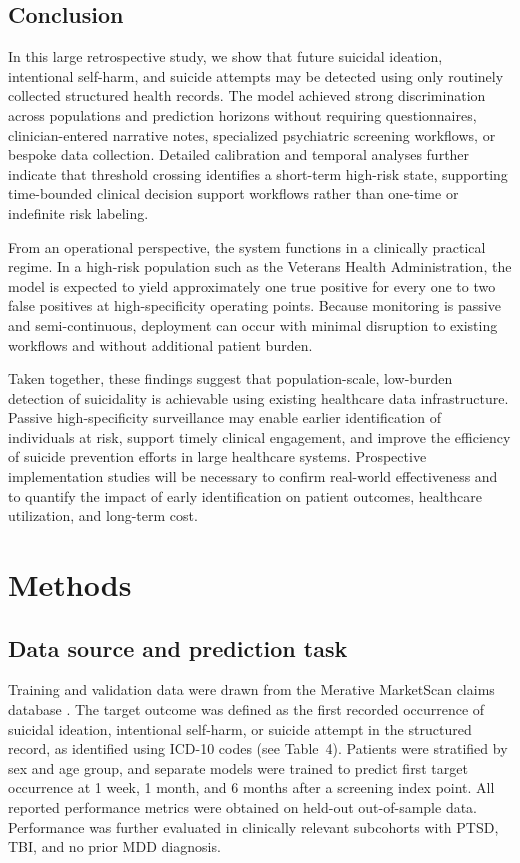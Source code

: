 \documentclass[onecolumn, compsoc,11pt]{IEEEtran}
\begin{document}
\subsection*{Conclusion}

In this large retrospective study, we show that future suicidal ideation, intentional self-harm, and suicide attempts may be detected using only routinely collected structured health records. The model achieved strong discrimination across populations and prediction horizons without requiring questionnaires, clinician-entered narrative notes, specialized psychiatric screening workflows, or bespoke data collection. Detailed calibration and temporal analyses further indicate that threshold crossing identifies a short-term high-risk state, supporting time-bounded clinical decision support workflows rather than one-time or indefinite risk labeling.

From an operational perspective, the system functions in a clinically practical regime. In a high-risk population such as the Veterans Health Administration, the model is expected to yield approximately one true positive for every one to two false positives at high-specificity operating points. Because monitoring is passive and semi-continuous, deployment can occur with minimal disruption to existing workflows and without additional patient burden.

Taken together, these findings suggest that population-scale, low-burden detection of suicidality is achievable using existing healthcare data infrastructure. Passive high-specificity surveillance may enable earlier identification of individuals at risk, support timely clinical engagement, and improve the efficiency of suicide prevention efforts in large healthcare systems. Prospective implementation studies will be necessary to confirm real-world effectiveness and to quantify the impact of early identification on patient outcomes, healthcare utilization, and long-term cost.



\section*{Methods}

\subsection*{Data source and prediction task}

Training and validation data were drawn from the Merative MarketScan claims database \cite{hansen2017truven}. The target outcome was defined as the first recorded occurrence of suicidal ideation, intentional self-harm, or suicide attempt in the structured record, as identified using ICD-10 codes (see Table~4).
Patients were stratified by sex and age group, and separate models were trained to predict first target occurrence at 1 week, 1 month, and 6 months after a screening index point. All reported performance metrics were obtained on held-out out-of-sample data. Performance was further evaluated in clinically relevant subcohorts with PTSD, TBI, and no prior MDD diagnosis.
\end{document}
